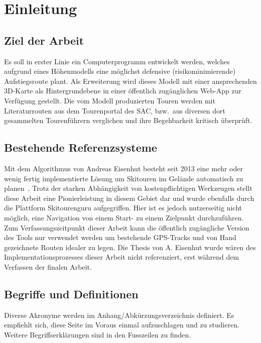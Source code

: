 
\section{Einleitung}

\subsection{Ziel der Arbeit}

Es soll in erster Linie ein Computerprogramm entwickelt werden, welches aufgrund eines Höhenmodells eine möglichst defensive (risikominimierende) Aufstiegsroute plant. Als Erweiterung wird dieses Modell mit einer ansprechenden 3D-Karte als Hintergrundebene in einer öffentlich zugänglichen Web-App zur Verfügung gestellt. Die vom Modell produzierten Touren werden mit Literaturrouten aus dem Tourenportal des SAC, bzw.\ aus diversen dort gesammelten Tourenführern verglichen und ihre Begehbarkeit kritisch überprüft.

\subsection{Bestehende Referenzsysteme}

Mit dem Algorithmus von Andreas Eisenhut besteht seit 2013 eine mehr oder wenig fertig implementierte Lösung um Skitouren im Gelände automatisch zu planen\ \cite{eisenhuttourknopfdruck}. Trotz der starken Abhängigkeit von kostenpflichtigen Werkzeugen stellt diese Arbeit eine Pionierleistung in diesem Gebiet dar und wurde ebenfalls durch die Plattform Skitourenguru aufgegriffen. Hier ist es jedoch nutzerseitig nicht möglich, eine Navigation von einem Start- zu einem Zielpunkt durchzuführen. Zum Verfassungszeitpunkt dieser Arbeit kann die öffentlich zugängliche Version des Tools nur verwendet werden um bestehende GPS-Tracks und von Hand gezeichnete Routen idealer zu legen. Die Thesis von A. Eisenhut wurde wären des Implementationsprozesses dieser Arbeit nicht referenziert, erst während dem Verfassen der finalen Arbeit.

\subsection{Begriffe und Definitionen}

Diverse Akronyme werden im Anhang/Abkürzungsverzeichnis definiert. Es empfiehlt sich, diese Seite im Voraus einmal aufzuschlagen und zu studieren. Weitere Begriffserklärungen sind in den Fusszeilen zu finden.

